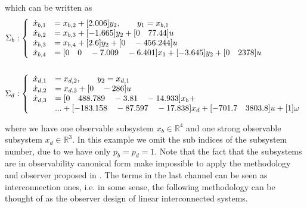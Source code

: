 \documentclass[11pt,letterpaper,twoside,openright]{report}
\begin{document}
which can be written as
\begin{equation}
	\begin{split}
		\Sigma_{b} &: \left\{
		\begin{array}{rl}
			\dot{x}_{b,1} &= x_{b,2} + [2.006]y_2,  \qquad y_1=x_{b,1}  \\
			\dot{x}_{b,2} &= x_{b,3} + [-1.665]y_2 + [0 \quad 77.44]u \\
			\dot{x}_{b,3} &= x_{b,4} + [2.6]y_2 + [0 \quad -456.244]u \\
			\dot{x}_{b,4} &= [0 \quad 0 \quad -7.009 \quad -6.401]x_1 + [-3.645]y_2 + [0 \quad 2378]u\\
		\end{array}
		\right. \\
		\vspace{2cm}\\
		\Sigma_{d} &: \left\{
		\begin{array}{rl}
			\dot{x}_{d,1} &= x_{d,2}, \qquad y_2=x_{d,1} \\
			\dot{x}_{d,2} &= x_{d,3} + [0 \quad -286]u \\ 
			\dot{x}_{d,3} &= [0 \quad 488.789 \quad -3.81 \quad -14.933]x_b + \\
			&...+ [-183.158 \quad -87.597 \quad -17.838]x_d + [-701.7 \quad 3803.8]u + [1]\omega 
		\end{array}
		\right. \\
	\end{split}
\end{equation}

where we have one observable subsystem $x_b \in \mathbb{R}^4$ and one strong observable subsystem $x_d \in \mathbb{R}^3$. In this example we omit the sub indices of the subsystem number, due to we have only $p_b=p_d=1$. Note that the fact that the subsystems are in observability canonical form make impossible to apply the methodology and observer proposed in \cite{Niederwieser2021}. The terms in the last channel can be seen as interconnection ones, i.e. in some sense, the following methodology can be thought of as the observer design of linear interconnected systems.
\end{document}
